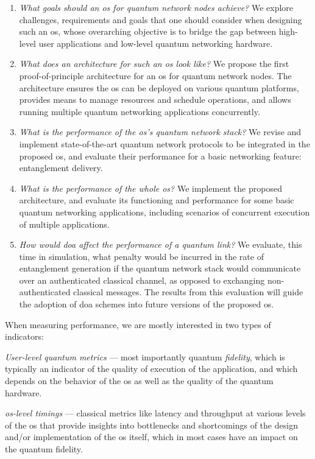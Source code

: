 \begin{enumerate}[label={Q\arabic*.}]
    \item \emph{What goals should an \acrshort{os} for quantum network nodes achieve?} We explore
          challenges, requirements and goals that one should consider when designing such an
          \acrshort{os}, whose overarching objective is to bridge the gap between high-level user
          applications and low-level quantum networking hardware.
    \item \emph{What does an architecture for such an \acrshort{os} look like?} We propose the first
          proof-of-principle architecture for an \acrshort{os} for quantum network nodes. The
          architecture ensures the \acrshort{os} can be deployed on various quantum platforms,
          provides means to manage resources and schedule operations, and allows running multiple
          quantum networking applications concurrently.
    \item \emph{What is the performance of the \acrshort{os}'s quantum network stack?} We revise and
          implement state-of-the-art quantum network protocols to be integrated in the proposed
          \acrshort{os}, and evaluate their performance for a basic networking feature: entanglement
          delivery.
    \item \emph{What is the performance of the whole \acrshort{os}?} We implement the proposed
          architecture, and evaluate its functioning and performance for some basic quantum
          networking applications, including scenarios of concurrent execution of multiple
          applications.
    \item \emph{How would \acrlong{doa} affect the performance of a quantum link?} We evaluate, this
          time in simulation, what penalty would be incurred in the rate of entanglement generation
          if the quantum network stack would communicate over an authenticated classical channel, as
          opposed to exchanging non-authenticated classical messages. The results from this
          evaluation will guide the adoption of \acrlong{doa} schemes into future versions of the
          proposed \acrshort{os}.
\end{enumerate}

When measuring performance, we are mostly interested in two types of indicators:
%
\begin{inlinelist}
    \item \emph{User-level quantum metrics} --- most importantly quantum \emph{fidelity}, which is
          typically an indicator of the quality of execution of the application, and which depends
          on the behavior of the \acrshort{os} as well as the quality of the quantum hardware.
    \item \emph{\acrshort{os}-level timings} --- classical metrics like latency and throughput at
          various levels of the \acrshort{os} that provide insights into bottlenecks and
          shortcomings of the design and/or implementation of the \acrshort{os} itself, which in
          most cases have an impact on the quantum fidelity.
\end{inlinelist}

